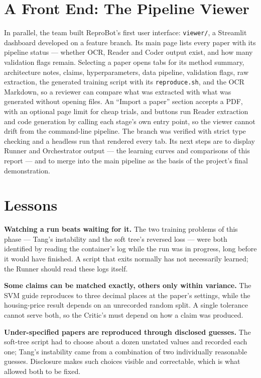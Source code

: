 \documentclass[11pt]{article}
\begin{document}
\section{A Front End: The Pipeline Viewer}
\label{sec:viewer}

In parallel, the team built ReproBot's first user interface: \texttt{viewer/}, a Streamlit
dashboard developed on a feature branch. Its main page lists every paper with its pipeline
status --- whether OCR, Reader and Coder output exist, and how many validation flags remain.
Selecting a paper opens tabs for its method summary, architecture notes, claims,
hyperparameters, data pipeline, validation flags, raw extraction, the generated training script
with its \texttt{reproduce.sh}, and the OCR Markdown, so a reviewer can compare what was
extracted with what was generated without opening files. An ``Import a paper'' section accepts
a PDF, with an optional page limit for cheap trials, and buttons run Reader extraction and code
generation by calling each stage's own entry point, so the viewer cannot drift from the
command-line pipeline. The branch was verified with strict type checking and a headless run
that rendered every tab. Its next steps are to display Runner and Orchestrator output --- the
learning curves and comparisons of this report --- and to merge into the main pipeline as the
basis of the project's final demonstration.

\section{Lessons}
\label{sec:lessons}

\textbf{Watching a run beats waiting for it.} The two training problems of this phase --- Tang's
instability and the soft tree's reversed loss --- were both identified by reading the
container's log while the run was in progress, long before it would have finished. A script
that exits normally has not necessarily learned; the Runner should read these logs itself.

\textbf{Some claims can be matched exactly, others only within variance.} The SVM guide
reproduces to three decimal places at the paper's settings, while the housing-price result
depends on an unrecorded random split. A single tolerance cannot serve both, so the Critic's
must depend on how a claim was produced.

\textbf{Under-specified papers are reproduced through disclosed guesses.} The soft-tree script
had to choose about a dozen unstated values and recorded each one; Tang's instability came from
a combination of two individually reasonable guesses. Disclosure makes such choices visible and
correctable, which is what allowed both to be fixed.
\end{document}
